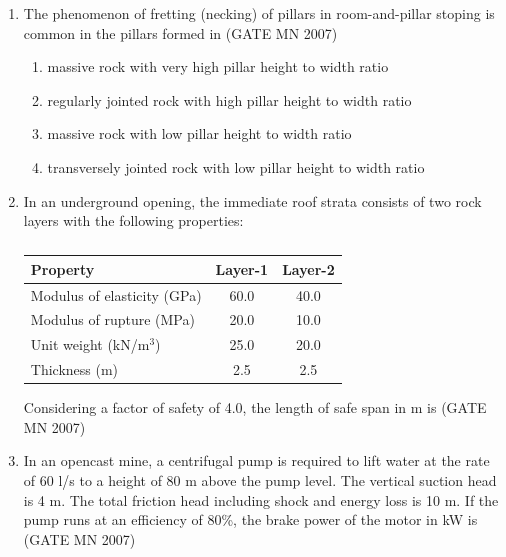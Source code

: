 \documentclass[journal]{IEEEtran}
\begin{document}
\begin{enumerate}
\item The phenomenon of fretting (necking) of pillars in room-and-pillar stoping is common in the pillars formed in
	\hfill (GATE MN 2007)
\begin{enumerate}
\item massive rock with very high pillar height to width ratio
\item regularly jointed rock with high pillar height to width ratio
\item massive rock with low pillar height to width ratio
\item transversely jointed rock with low pillar height to width ratio
\end{enumerate}
\item In an underground opening, the immediate roof strata consists of two rock layers with the following properties:

\begin{table}[H]
    \centering\normalsize
\begin{tabular}{|l|c|c|}
\hline
Property & Layer-1 & Layer-2 \\
\hline
Modulus of elasticity (GPa) & 60.0 & 40.0 \\
\hline
Modulus of rupture (MPa) & 20.0 & 10.0 \\
\hline
Unit weight (kN/m$^3$) & 25.0 & 20.0 \\
\hline
Thickness (m) & 2.5 & 2.5 \\
\hline
\end{tabular}
\caption*{}
    \label{tab:Q37}
\end{table}

Considering a factor of safety of 4.0, the length of safe span in m is
\hfill (GATE MN 2007)
\begin{enumerate}
\end{enumerate}


\item In an opencast mine, a centrifugal pump is required to lift water at the rate of 60 l/s to a height of 80 m above the pump level. The vertical suction head is 4 m. The total friction head including shock and energy loss is 10 m. If the pump runs at an efficiency of 80\%, the brake power of the motor in kW is
	\hfill (GATE MN 2007)
\begin{enumerate}
\end{enumerate}




\end{enumerate}
\end{document}
